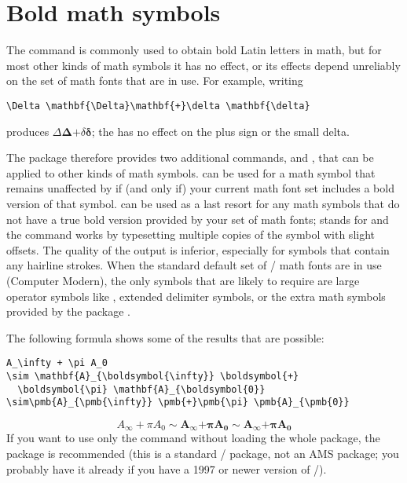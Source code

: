 \documentclass[leqno,titlepage,openany]{amsldoc}[1999/12/13]
\begin{document}
\section{Bold math symbols}

The  command is commonly used to obtain bold Latin letters in
math, but for most other kinds of math symbols it has no effect, or its
effects depend unreliably on the set of math fonts that are in use. For
example, writing
\begin{verbatim}
\Delta \mathbf{\Delta}\mathbf{+}\delta \mathbf{\delta}
\end{verbatim}
produces $\Delta \mathbf{\Delta}\mathbf{+}\delta
\mathbf{\delta}$; the  has no effect on the plus
sign or the small delta.

The  package therefore provides two additional commands,
 and , that can be applied to other kinds of math
symbols.  can be used for a math symbol that remains
unaffected by  if (and only if) your current math font set
includes a bold version of that symbol.  can be used as a last
resort for any math symbols that do not have a true bold version
provided by your set of math fonts;  stands for  and the command works by typesetting multiple copies of the symbol
with slight offsets. The quality of the output is inferior, especially
for symbols that contain any hairline strokes. When the standard default set of
\latex/ math fonts are in use (Computer Modern), the only symbols that
are likely to require  are large operator symbols like ,
extended delimiter symbols, or the extra math symbols provided by
the  package \cite{amsfonts}.

The following formula shows some of the results that are possible:
\begin{verbatim}
A_\infty + \pi A_0
\sim \mathbf{A}_{\boldsymbol{\infty}} \boldsymbol{+}
  \boldsymbol{\pi} \mathbf{A}_{\boldsymbol{0}}
\sim\pmb{A}_{\pmb{\infty}} \pmb{+}\pmb{\pi} \pmb{A}_{\pmb{0}}
\end{verbatim}
\begin{equation*}
A_\infty + \pi A_0
\sim \mathbf{A}_{\boldsymbol{\infty}} \boldsymbol{+}
  \boldsymbol{\pi} \mathbf{A}_{\boldsymbol{0}}
\sim\pmb{A}_{\pmb{\infty}} \pmb{+}\pmb{\pi} \pmb{A}_{\pmb{0}}
\end{equation*}
If you want to use only the  command without loading the
whole  package, the  package is recommended (this
is a standard \latex/ package, not an AMS package; you probably have it
already if you have a 1997 or newer version of \latex/).
\end{document}
